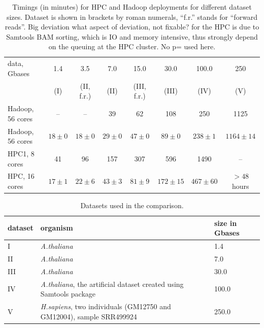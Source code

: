 \documentclass[10pt]{article}
\newcommand{\COMMENT}[1]{{\color{red} #1 }}
\begin{document}
\begin{table}[!ht]
\small

\caption{Timings  (in minutes) for HPC and  Hadoop deployments for different dataset sizes.    Dataset is shown in brackets by roman numerals, ``f.r.'' stands for ``forward reads''. Big deviation \COMMENT{what aspect of deviation, not fixable?} for the HPC is due to Samtools BAM sorting, which is IO and memory intensive, thus strongly depend on the queuing at the HPC cluster. \COMMENT{No p= used here.} }
\begin{center}
\begin{tabular}{l|c|c|c|c|c|c|c}

data, Gbases		&	1.4	&	3.5		&	7.0		&	15.0		&	30.0		&	100.0	&	250 	\\
				&	(I)	&	(II, f.r.)	&	(II)		&	(III, f.r.)	&	(III)		&	(IV)		&	(V)\\
\hline
Hadoop, 56 cores&--&	--	&39		&62	&108	&250&1125\\
Hadoop, 56 cores		&	$18\pm0	$	&	$18\pm0	$	&	$29\pm0$	&	$47\pm0	$	&	$89\pm0$	&	$238\pm1$		&	$1164\pm14$\\
HPC1, 8 cores&	41&	96	&157	&307	&596	&1490&--\\
HPC, 16 cores	&	$17\pm1$	&	$22\pm6$	&	$43\pm3$	&	$81\pm9$	&	$172\pm15$		&	$467\pm60$	& $>48$ hours\\

\end{tabular}
\end{center}
\label{table:4}
\normalsize
\end{table}%


\begin{table}[!ht]
\small
\footnotesize
\caption{Datasets used in the comparison. }
\begin{center}
\begin{tabular}{|l|l|l|}
dataset &	organism &	size in Gbases\\
\hline
 I		&	{\it A.thaliana}	&	1.4	\\
 II	&	{\it A.thaliana}	&	7.0\\
  III	&	{\it A.thaliana}	&	30.0	\\
 IV	&{\it A.thaliana}, the artificial dataset created using Samtools package	&	100.0	\\
 V	&	{\it H.sapiens}, two individuals (GM12750 and GM12004), sample SRR499924		&	250.0\\

\end{tabular}
\end{center}
\label{table:datasets}
\normalsize
\end{table}%
\end{document}

